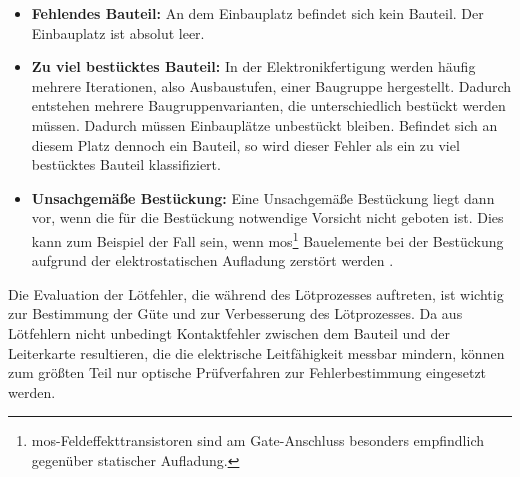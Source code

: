 \begin{itemize}
            \item \textbf{Fehlendes Bauteil:} An dem Einbauplatz befindet sich kein Bauteil. Der Einbauplatz ist absolut leer. \cite{berger_test-_2012}
            \item \textbf{Zu viel bestücktes Bauteil:} In der Elektronikfertigung werden häufig mehrere Iterationen, also Ausbaustufen, einer Baugruppe hergestellt. Dadurch entstehen mehrere Baugruppenvarianten, die unterschiedlich bestückt werden müssen. Dadurch müssen Einbauplätze unbestückt bleiben. Befindet sich an diesem Platz dennoch ein Bauteil, so wird dieser Fehler als ein zu viel bestücktes Bauteil klassifiziert. \cite{berger_test-_2012}
            \item \textbf{Unsachgemäße Bestückung:} Eine Unsachgemäße Bestückung liegt dann vor, wenn die für die Bestückung notwendige Vorsicht nicht geboten ist. Dies kann zum Beispiel der Fall sein, wenn \ac{mos}\footnote{\ac{mos}-Feldeffekttransistoren sind am Gate-Anschluss besonders empfindlich gegenüber statischer Aufladung.} Bauelemente bei der Bestückung aufgrund der elektrostatischen Aufladung zerstört werden \cite{karger_pruftechnik_1985}.
        \end{itemize}

        Die Evaluation der Lötfehler, die während des Lötprozesses auftreten, ist wichtig zur Bestimmung der Güte und zur Verbesserung des Lötprozesses. 
        Da aus Lötfehlern nicht unbedingt Kontaktfehler zwischen dem Bauteil und der Leiterkarte resultieren, die die elektrische Leitfähigkeit messbar mindern, können zum größten Teil nur optische Prüfverfahren zur Fehlerbestimmung eingesetzt werden. \cite{berger_test-_2012}

